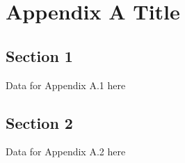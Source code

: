 \chapter{Appendix A Title}
\label{chp:appA}

\section{Section 1}
Data for Appendix A.1 here

\section{Section 2}
Data for Appendix A.2 here
